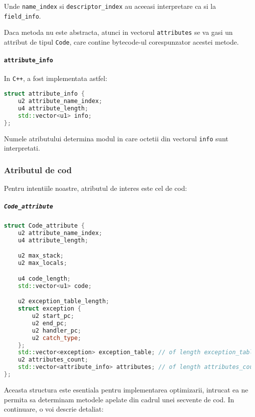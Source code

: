 Unde \texttt{name\_index} si \texttt{descriptor\_index} au aceeasi
interpretare ca si la \texttt{field\_info}.

Daca metoda nu este abstracta, atunci in vectorul \texttt{attributes} se
va gasi un attribut de tipul \texttt{Code}, care contine bytecode-ul
corespunzator acestei metode.

\paragraph{\texorpdfstring{\texttt{attribute\_info}}{attribute\_info}}\label{attribute_info}

In \texttt{C++}, a fost implementata astfel:

\begin{lstlisting}[language=C++]
struct attribute_info {
    u2 attribute_name_index;
    u4 attribute_length;
    std::vector<u1> info;
};
\end{lstlisting}

Numele atributului determina modul in care octetii din vectorul
\texttt{info} sunt interpretati.

\subsubsection{Atributul de cod}

Pentru intentiile noastre, atributul de interes este cel de cod:

\subparagraph{\texorpdfstring{\texttt{Code\_attribute}}{Code\_attribute}}\label{code_attribute}

\begin{lstlisting}[language=C++]
struct Code_attribute {
    u2 attribute_name_index;
    u4 attribute_length;

    u2 max_stack;
    u2 max_locals;

    u4 code_length;
    std::vector<u1> code;

    u2 exception_table_length;
    struct exception {
        u2 start_pc;
        u2 end_pc;
        u2 handler_pc;
        u2 catch_type;
    };
    std::vector<exception> exception_table; // of length exception_table_length.
    u2 attributes_count;
    std::vector<attribute_info> attributes; // of length attributes_count.
};
\end{lstlisting}

Aceasta structura este esentiala pentru implementarea optimizarii,
intrucat ea ne permita sa determinam metodele apelate din cadrul unei secvente de cod.
In continuare, o voi descrie detaliat:

